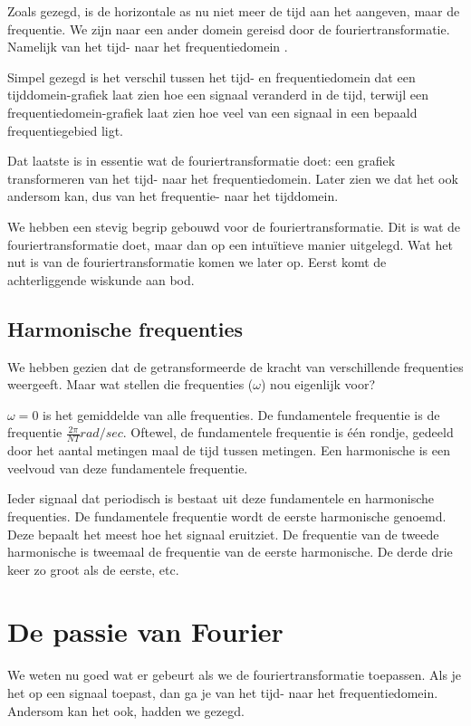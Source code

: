 \documentclass[11pt,fleqn]{book} %
\begin{document}
Zoals gezegd, is de horizontale as nu niet meer de tijd aan het aangeven, maar de frequentie. We zijn naar een ander domein gereisd door de fouriertransformatie. Namelijk van het tijd- naar het frequentiedomein \cite{fd}.

Simpel gezegd is het verschil tussen het tijd- en frequentiedomein dat een tijddomein-grafiek laat zien hoe een signaal veranderd in de tijd, terwijl een frequentiedomein-grafiek laat zien hoe veel van een signaal in een bepaald frequentiegebied ligt.

Dat laatste is in essentie wat de fouriertransformatie doet: een grafiek transformeren van het tijd- naar het frequentiedomein. Later zien we dat het ook andersom kan, dus van het frequentie- naar het tijddomein.

We hebben een stevig begrip gebouwd voor de fouriertransformatie. Dit is wat de fouriertransformatie doet, maar dan op een intuïtieve manier uitgelegd. Wat het nut is van de fouriertransformatie komen we later op. Eerst komt de achterliggende wiskunde aan bod.

\subsection{Harmonische frequenties}
We hebben gezien dat de getransformeerde de kracht van verschillende frequenties weergeeft. Maar wat stellen die frequenties ($\omega$) nou eigenlijk voor?

$\omega=0$ is het gemiddelde van alle frequenties. De fundamentele frequentie is de frequentie $\frac{2\pi}{NT} rad/sec$. Oftewel, de fundamentele frequentie is één rondje, gedeeld door het aantal metingen maal de tijd tussen metingen. Een harmonische is een veelvoud van deze fundamentele frequentie.

Ieder signaal dat periodisch is bestaat uit deze fundamentele en harmonische frequenties. De fundamentele frequentie wordt de eerste harmonische genoemd. Deze bepaalt het meest hoe het signaal eruitziet. De frequentie van de tweede harmonische is tweemaal de frequentie van de eerste harmonische. De derde drie keer zo groot als de eerste, etc.

\section{De passie van Fourier}
We weten nu goed wat er gebeurt als we de fouriertransformatie toepassen. Als je het op een signaal toepast, dan ga je van het tijd- naar het frequentiedomein. Andersom kan het ook, hadden we gezegd.
\end{document}
